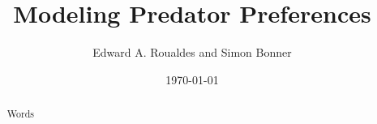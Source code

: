 \documentclass[12pt]{article}
\begin{document}
\title{Modeling Predator Preferences}
\author{Edward A. Roualdes and Simon Bonner}
\date{\today}
\maketitle

\begin{abstract}
Words
\end{abstract}







%
%
\end{document}

